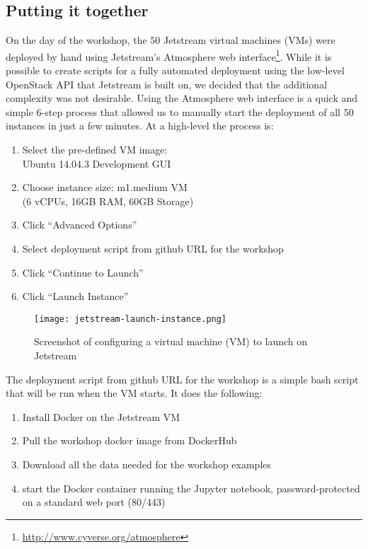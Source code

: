 \subsection{Putting it together}

On the day of the workshop, the 50 Jetstream virtual machines (VMs) were
deployed by hand using Jetstream's Atmosphere \cite{NiravCyberinfra2016} web interface\footnote{\url{http://www.cyverse.org/atmosphere}}. While it is possible to create
scripts for a fully automated deployment using the low-level OpenStack API that
Jetstream is built on, we decided that the additional complexity was not
desirable. Using the Atmosphere web interface is a quick and simple 6-step
process that allowed us to manually start the deployment of all 50 instances in
just a few minutes. At a high-level the process is:

\begin{enumerate}
\item Select the pre-defined VM image: \\Ubuntu 14.04.3 Development GUI
\item Choose instance size: m1.medium VM \\(6 vCPUs, 16GB RAM, 60GB
  Storage)
\item Click ``Advanced Options''
\item Select deployment script from github URL for the workshop
\item Click ``Continue to Launch''
\item Click ``Launch Instance''
\end{enumerate}

\begin{figure}[h]
\centering
\texttt{[image: jetstream-launch-instance.png]}
\caption{Screenshot of configuring a virtual machine (VM) to launch on Jetstream}
\end{figure}

The deployment script from github URL for the workshop is a simple bash script
that will be run when the VM starts. It does the following:

\begin{enumerate}
\item Install Docker on the Jetstream VM
\item Pull the workshop docker image from DockerHub
\item Download all the data needed for the workshop examples
\item start the Docker container running the Jupyter notebook, password-protected on a standard web port (80/443)
\end{enumerate}

